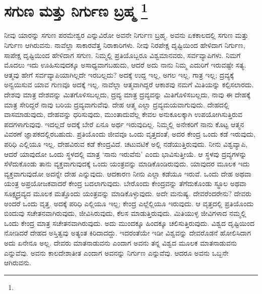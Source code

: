 
\chapter[ಸಗುಣ ಮತ್ತು ನಿರ್ಗುಣ ಬ್ರಹ್ಮ ]{ಸಗುಣ ಮತ್ತು ನಿರ್ಗುಣ ಬ್ರಹ್ಮ \protect\footnote{}}

ನೀವು ಯಾರನ್ನು ಸಗುಣ ಪರಮೇಶ್ವರ ಎನ್ನುವಿರೋ ಅವನೇ ನಿರ್ಗುಣ ಬ್ರಹ್ಮ. ಅವನು ಏಕಕಾಲದಲ್ಲಿ ಸಗುಣ ಮತ್ತು ನಿರ್ಗುಣ ಆಗಿರುವನು. ನಾವೆಲ್ಲಾ ಸಾಕಾರವೆತ್ತ ನಿರಾಕಾರಿಗಳು. ನೀವು ನಿರಪೇಕ್ಷ ದೃಷ್ಟಿಯಿಂದ ಹೇಳಿದಾಗ ನಿರ್ಗುಣ, ಸಾಪೇಕ್ಷ ದೃಷ್ಟಿಯಿಂದ ಹೇಳಿದಾಗ ಸಗುಣ. ನಿಮ್ಮಲ್ಲಿ ಪ್ರತಿಯೊಬ್ಬರೂ ವಿಶ್ವಮಾನವರು, ಸರ್ವವ್ಯಾಪಿಗಳು. ನಿಮಗೆ ಮೊದಲು ಇದು ಊಹಿಸುವುದಕ್ಕೂ ಅಸಾಧ್ಯವಾಗಬಹುದು, ಆದರೆ ಅದು ನಾನು ನಿಮ್ಮ ಎದುರಿಗೆ ಇರುವಷ್ಟೇ ಸತ್ಯ. ಆತ್ಮವು ಹೇಗೆ ಸರ್ವವ್ಯಾಪಿಯಾಗಿಲ್ಲದೇ ಇರಬಲ್ಲದು? ಅದಕ್ಕೆ ಉದ್ದ ಇಲ್ಲ, ಅಗಲ ಇಲ್ಲ, ಗಾತ್ರ ಇಲ್ಲ; ದ್ರವ್ಯಕ್ಕೆ ಅನ್ವಯಿಸುವ ಯಾವ ಗುಣವೂ ಅದಕ್ಕೆ ಇಲ್ಲ. ನಾವೆಲ್ಲಾ ಆತ್ಮವಾಗಿದ್ದರೆ ಆಕಾಶವು ನಮಗೆ ಮಿತಿಯನ್ನು ಕಲ್ಪಿಸಲಾರದು. ದೇಶವು ಮಾತ್ರ ದೇಶವನ್ನು ಮಿತಗೊಳಿಸಬಲ್ಲದು, ದ್ರವ್ಯ ಮಾತ್ರ ದ್ರವ್ಯವನ್ನು ಮಿತಿಗೊಳಿಸಬಲ್ಲದು, ನಾವು ಈ ದೇಹಕ್ಕೆ ಮಾತ್ರ ಸೇರಿದ್ದರೆ ನಾವು ಬರಿಯ ದ್ರವ್ಯವಾಗುವೆವು. ದೇಹ ಆತ್ಮ ಎಲ್ಲಾ ದ್ರವ್ಯಮಯವಾಗುವುದು. ದೇಹದಲ್ಲಿ ವಾಸಮಾಡುವುದು, ದೇಹವನ್ನು ಧರಿಸುವುದು, ಮುಂತಾದುವೆಲ್ಲ ಕೇವಲ ಅನುಕೂಲಕ್ಕಾಗಿ ಉಪಯೋಗಿಸುತ್ತಿರುವ ಪದಗಳಾಗುವುವು. ಇದಲ್ಲದೆ ಅದಕ್ಕೆ ಬೇರೆ ಏನೂ ಅರ್ಥ ಇರುವುದಿಲ್ಲ. ನಿಮ್ಮಲ್ಲಿ ಅನೇಕರಿಗೆ ನಾನು ಕೊಟ್ಟ ಆತ್ಮನ ವಿವರಣೆ ಜ್ಞಾಪಕದಲ್ಲಿರಬಹುದು. ಪ್ರತಿಯೊಂದು ಜೀವವೂ ಒಂದು ವೃತ್ತದಂತೆ, ಅದರ ಕೇಂದ್ರ ಒಂದು ಕಡೆ ಇರುವುದು, ಪರಿಧಿ ಎಲ್ಲಿಯೂ ಇಲ್ಲ. ದೇಹವಿರುವ ಕಡೆ ಕೇಂದ್ರವಿದೆ. ಚಟುವಟಿಕೆ ಅಲ್ಲಿ ನಡೆಯುತ್ತಿರುವುದು. ನೀನು ವಿಶ್ವವ್ಯಾಪಿ, ಆದರೆ ಯಾವುದೋ ಒಂದು ಸ್ಥಳದಲ್ಲಿ ಮಾತ್ರ ‘ನಾನು ಇರುವೆನು’ ಎಂದು ಭಾವಿಸುತ್ತೀಯೆ. ಆ ಸ್ಥಳವು ದ್ರವ್ಯಗಳನ್ನು ಸೆಳೆದುಕೊಂಡು ತಾನು ವ್ಯಕ್ತವಾಗುವುದಕ್ಕೆ ಒಂದು ಯಂತ್ರವನ್ನು ಮಾಡಿಕೊಂಡಿರುವುದು. ಯಾವುದರ ಮೂಲಕ ಇದು ವ್ಯಕ್ತವಾಗುವುದೋ ಅದನ್ನೇ ದೇಹ ಎನ್ನುವುದು. ಆದಕಾರಣ ನೀನು ಎಲ್ಲಾ ಕಡೆಯೂ ಇರುವೆ. ಒಂದು ದೇಹ ಅಥವಾ ಯಂತ್ರ ಅಪ್ರಯೋಜಕವಾದರೆ ಕೇಂದ್ರ ಬದಲಾಗುವುದು. ಬೇರೊಂದು ಕೇಂದ್ರವನ್ನು ತೆಗೆದುಕೊಂಡು ಸ್ಥೂಲ ಅಥವಾ ಸೂಕ್ಷ್ಮದ್ರವ್ಯದ ಮೂಲಕ ಮತ್ತೊಂದು ಯಂತ್ರವನ್ನು ಮಾಡಿಕೊಳ್ಳುವುದು. ಅದೇ ಮನುಷ್ಯ. ದೇವರೆಂದರೇನು? ದೇವರು ಅಂದರೆ ಒಂದು ವೃತ್ತ. ಅದಕ್ಕೆ ಪರಿಧಿ ಎಲ್ಲಿಯೂ ಇಲ್ಲ; ಕೇಂದ್ರ ಎಲ್ಲೆಲ್ಲಿಯೂ ಇರುವುದು. ಆ ವೃತ್ತದಲ್ಲಿ ಪ್ರತಿಯೊಂದು ಬಿಂದುವು ಸಚೇತನವಾಗಿರುವುದು, ಜೀವಿಸಿರುವುದು, ಕೆಲಸ ಮಾಡುತ್ತಿರುವುದು. ಮಿತಿಯುಳ್ಳ ಜೀವಿಗಳಾದ ನಮ್ಮಲ್ಲಿ ಒಂದು ಕೇಂದ್ರ ಮಾತ್ರ ಸಚೇತನವಾಗಿರುವುದು. ಅದು ಮುಂದಕ್ಕೂ ಹಿಂದಕ್ಕೂ ಚಲಿಸುತ್ತಿರುವುದು. ವಿಶ್ವದ ದೃಷ್ಟಿಯಿಂದ ನೋಡಿದರೆ ದೇಹದ ಅಸ್ತಿತ್ವವು ಅತ್ಯಂತ ಕಿರಿದಾದದ್ದು. ಇದರಂತೆಯೇ ಇಡೀ ವಿಶ್ವವನ್ನು ದೇವರೊಡನೆ ಹೋಲಿಸಿದಾಗ ಅದು ಏನೇನೂ ಅಲ್ಲ. ದೇವರು ಮಾತನಾಡುವನು ಎಂದಾಗ ಅವನು ತನ್ನ ವಿಶ್ವದ ಮೂಲಕ ಮಾತನಾಡುವನು ಎನ್ನುವೆವು. ಅವನು ಕಾಲದೇಶಾತೀತ ಎಂದಾಗ ಅವನನ್ನು ನಿರ್ಗುಣ ಎನ್ನುವೆವು. ಆದರೂ ಅವನು ಒಬ್ಬನೇ ಆಗಿರುವನು.

\vskip 6pt

